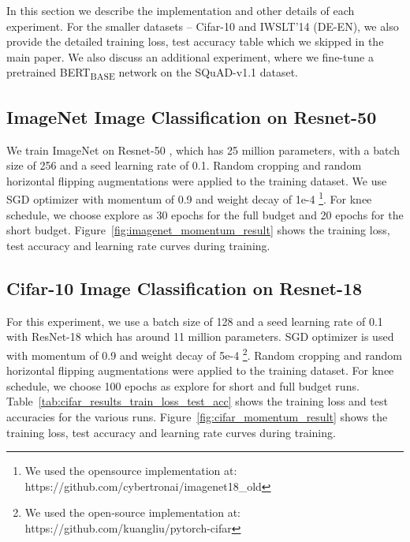 \documentclass{article} \usepackage{iclr2021_conference,times}
\begin{document}
In this section we describe the implementation and other details of each experiment. For the smaller datasets -- Cifar-10 and IWSLT'14 (DE-EN), we also provide the detailed training loss, test accuracy table which we skipped in the main paper. We also discuss an additional experiment, where we fine-tune a pretrained BERT\textsubscript{BASE} network on the SQuAD-v1.1 dataset.


\subsection{ImageNet Image Classification on Resnet-50}

We train ImageNet \cite{imagenet-dataset} on Resnet-50 \cite{resnet_he_2016}, which has 25 million parameters, with a batch size of 256 and a seed learning rate of 0.1. Random cropping and random horizontal flipping augmentations were applied to the training dataset. We use SGD optimizer with momentum of 0.9 and weight decay of 1e-4 \footnote{We used the opensource implementation at: https://github.com/cybertronai/imagenet18\_old}. For knee schedule, we choose explore as 30 epochs for the full budget and 20 epochs for the short budget. Figure~\ref{fig:imagenet_momentum_result} shows the training loss, test accuracy and learning rate curves during training.

\subsection{Cifar-10 Image Classification on Resnet-18}
For this experiment, we use a batch size of 128 and a seed learning rate of 0.1 with ResNet-18\cite{resnet_he_2016} which has around 11 million parameters. SGD optimizer is used with momentum of 0.9 and weight decay of 5e-4 \footnote{We used the open-source implementation at: https://github.com/kuangliu/pytorch-cifar}. Random cropping and random horizontal flipping augmentations were applied to the training dataset. For knee schedule, we choose 100 epochs as explore for short and full budget runs. Table~\ref{tab:cifar_results_train_loss_test_acc} shows the training loss and test accuracies for the various runs. Figure~\ref{fig:cifar_momentum_result} shows the training loss, test accuracy and learning rate curves during training.  
\end{document}
